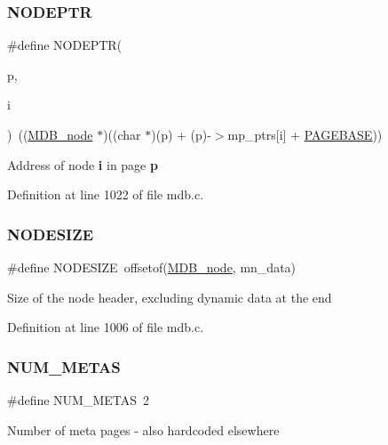 \subsubsection{\texorpdfstring{N\+O\+D\+E\+P\+TR}{NODEPTR}}
{\footnotesize\ttfamily \#define N\+O\+D\+E\+P\+TR(\begin{DoxyParamCaption}\item[{}]{p,  }\item[{}]{i }\end{DoxyParamCaption})~((\mbox{\hyperlink{struct_m_d_b__node}{M\+D\+B\+\_\+node}} $\ast$)((char $\ast$)(p) + (p)-\/$>$mp\+\_\+ptrs\mbox{[}i\mbox{]} + \mbox{\hyperlink{group__internal_ga42d35f5d5bf3f161dc064ac7f78a2838}{P\+A\+G\+E\+B\+A\+SE}}))}

Address of node {\bfseries i} in page {\bfseries p} 

Definition at line 1022 of file mdb.\+c.

\mbox{\label{group__internal_ga7d24748fedf732c90d840cbf0714d8d8}} 
\subsubsection{\texorpdfstring{N\+O\+D\+E\+S\+I\+ZE}{NODESIZE}}
{\footnotesize\ttfamily \#define N\+O\+D\+E\+S\+I\+ZE~offsetof(\mbox{\hyperlink{struct_m_d_b__node}{M\+D\+B\+\_\+node}}, mn\+\_\+data)}

Size of the node header, excluding dynamic data at the end 

Definition at line 1006 of file mdb.\+c.

\mbox{\label{group__internal_gae066f6a2b21f2003b622dc654bc58327}} 
\subsubsection{\texorpdfstring{N\+U\+M\+\_\+\+M\+E\+T\+AS}{NUM\_METAS}}
{\footnotesize\ttfamily \#define N\+U\+M\+\_\+\+M\+E\+T\+AS~2}

Number of meta pages -\/ also hardcoded elsewhere 

